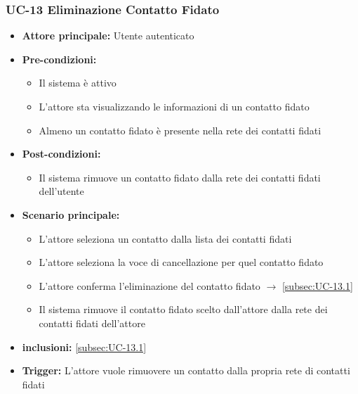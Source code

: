 \documentclass[a4paper,12pt]{article}
\begin{document}

\subsubsection{UC-13 Eliminazione Contatto Fidato} \label{subsec:UC-13}
\begin{itemize}
    \item \textbf{Attore principale:} Utente autenticato
    \item \textbf{Pre-condizioni:}
    \begin{itemize}
        \item Il sistema è attivo
        \item L'attore sta visualizzando le informazioni di un contatto fidato
        \item Almeno un contatto fidato è presente nella rete dei contatti fidati
    \end{itemize}
    \item \textbf{Post-condizioni:}
    \begin{itemize}
        \item Il sistema rimuove un contatto fidato dalla rete dei contatti fidati dell'utente
    \end{itemize}
    \item \textbf{Scenario principale:} 
    \begin{itemize}
        \item L'attore seleziona un contatto dalla lista dei contatti fidati
        \item L'attore seleziona la voce di cancellazione per quel contatto fidato
        \item L'attore conferma l'eliminazione del contatto fidato $\rightarrow$ \ref{subsec:UC-13.1}
        \item Il sistema rimuove il contatto fidato scelto dall'attore dalla rete dei contatti fidati dell'attore
    \end{itemize}
    \item \textbf{inclusioni:} \ref{subsec:UC-13.1}
    \item \textbf{Trigger:} L'attore vuole rimuovere un contatto dalla propria rete di contatti fidati
\end{itemize}
\end{document}
